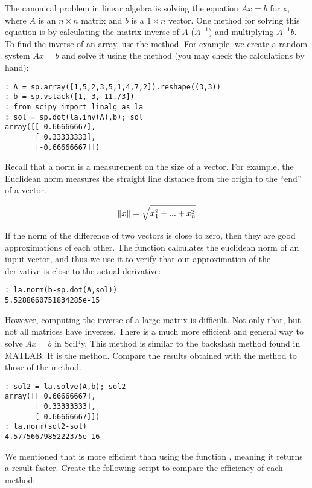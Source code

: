 The canonical problem in linear algebra is solving the equation $Ax = b$ for x,
where $A$ is an $n \times n$ matrix and $b$ is a  $1 \times n$ vector.  One method for solving this equation is by calculating the matrix inverse of $A$ ($A^{-1}$) and multiplying $A^{-1}b$.  To find the inverse of an array, use the  method.
For example, we create a random system $Ax =b$ and solve it using the  method (you may check the calculations by hand):

\begin{lstlisting}
: A = sp.array([1,5,2,3,5,1,4,7,2]).reshape((3,3))
: b = sp.vstack([1, 3, 11./3])
: from scipy import linalg as la
: sol = sp.dot(la.inv(A),b); sol
array([[ 0.66666667],
       [ 0.33333333],
       [-0.66666667]])
\end{lstlisting}

Recall that a norm is a measurement on the size of a vector.  For example, the
Euclidean norm measures the straight line distance from the origin to the
``end'' of a vector.

\[
\left\lVert x\right\rVert = \sqrt{x_1^2 + ... + x_n^2}
\]

If the norm of the difference of two vectors is close to zero, then they are
good approximations of each other.  The  function calculates the
euclidean norm of an input vector, and thus we use it to verify that our
approximation of the derivative is close to the actual derivative:
\begin{lstlisting}
: la.norm(b-sp.dot(A,sol))
5.5288660751834285e-15
\end{lstlisting}

However, computing the inverse of a large matrix is difficult.  Not only that, but not all matrices have inverses.  There is a much more efficient and general way to solve $Ax=b$ in SciPy.  This method is similar to the backslash method found in MATLAB.  It is the  method. Compare the results obtained with the  method to those of the  method.
\begin{lstlisting}
: sol2 = la.solve(A,b); sol2
array([[ 0.66666667],
       [ 0.33333333],
       [-0.66666667]])
: la.norm(sol2-sol)
4.5775667985222375e-16
\end{lstlisting}

We mentioned that  is more efficient than using the
function , meaning it returns a result faster. Create the following script to compare the efficiency of each method:

